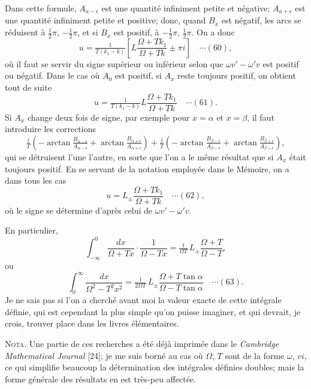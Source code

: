 \documentclass[12pt,a4paper]{article}
\begin{document}
Dans cette formule, $A_{a-\epsilon}$ est une quantit\'e infiniment petite et n\'egative; $A_{a+\epsilon}$ est une quantit\'e infiniment petite et positive; donc, quand $B_x$ est n\'egatif, les arcs se r\'eduisent \`a $\tfrac12\pi$, $-\tfrac12\pi$, et si $B_x$ est positif, \`a $-\tfrac12\pi$, $\tfrac12\pi$. On a donc
\[
u = \tfrac{1}{T(k_1 - k)}\left[L\frac{\Omega + T k_1}{\Omega + Tk} \pm \pi i\right] \quad\cdots(60),
\]
o\`u il faut se servir du signe sup\'erieur ou inf\'erieur selon que $\omega v' - \omega' v$ est positif ou n\'egatif. Dans le cas o\`u $A_0$ est positif, si $A_x$ reste toujours positif, on obtient tout de suite
\[
u = \tfrac{1}{T(k_1 - k)}L\frac{\Omega + T k_1}{\Omega + Tk} \quad\cdots(61).
\]
Si $A_x$ change deux fois de signe, par exemple pour $x = \alpha$ et $x = \beta$, il faut introduire les corrections
\[
\tfrac{i}{T}\left(-\arctan\tfrac{B_{\alpha-\epsilon}}{A_{\alpha-\epsilon}} + \arctan\tfrac{B_{\alpha+\epsilon}}{A_{\alpha+\epsilon}}\right) + \tfrac{i}{T}\left(-\arctan\tfrac{B_{\beta-\epsilon}}{A_{\beta-\epsilon}} + \arctan\tfrac{B_{\beta+\epsilon}}{A_{\beta+\epsilon}}\right),
\]
qui se d\'etruisent l'une l'autre, en sorte que l'on a le m\^eme r\'esultat que si $A_x$ \'etait toujours positif. En se servant de la notation employ\'ee dans le M\'emoire, on a dans tous les cas
\[
u = L_{\pm}\frac{\Omega + T k_1}{\Omega + Tk} \quad\cdots(62),
\]
o\`u le signe se d\'etermine d'apr\`es celui de $\omega v' - \omega' v$.

En particulier,
\[
\int_{-\infty}^{0}\frac{dx}{\Omega + Tx}\cdot\frac{1}{\Omega - Tx} = \tfrac{1}{\Omega T}\,L_{\pm}\frac{\Omega + T}{\Omega - T},
\]
ou
\[
\int_0^{\infty}\frac{dx}{\Omega^2 - T^2 x^2} = \tfrac{1}{2\Omega T}\,L_{\pm}\frac{\Omega + T\tan\alpha}{\Omega - T\tan\alpha} \quad\cdots(63).
\]
Je ne sais pas si l'on a cherch\'e avant moi la valeur exacte de cette int\'egrale d\'efinie, qui est cependant la plus simple qu'on puisse imaginer, et qui devrait, je crois, trouver place dans les livres \'el\'ementaires.

\medskip
\textsc{Nota.} Une partie de ces recherches a \'et\'e d\'ej\`a imprim\'ee dans le \textit{Cambridge Mathematical Journal} [24]; je me suis born\'e au cas o\`u $\Omega$, $T$ sont de la forme $\omega$, $vi$, ce qui simplifie beaucoup la d\'etermination des int\'egrales d\'efinies doubles; mais la forme g\'en\'erale des r\'esultats en est tr\`es-peu affect\'ee.

\newpage
\setcounter{page}{183}
\end{document}
